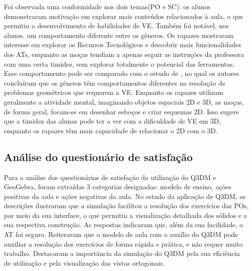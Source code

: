 Foi observada uma conformidade nos dois temas(PO e SC): os alunos
demonstraram motivação em explorar mais conteúdos relacionados à aula, o
que permitiu o desenvolvimento de habilidades de VE. Também foi notável,
nos alunos, um comportamento diferente entre os gêneros. Os rapazes
mostraram interesse em explorar os Recursos Tecnológicos e descobrir
mais funcionalidades dos ATs, enquanto as moças tendiam a apenas seguir
as instruções da professora com uma certa timidez, sem explorar
totalmente o potencial das ferramentas. Esse comportamento pode ser
comparado com o estudo de \textcite{fiantika2018}, no qual os autores
concluíram que os gêneros têm comportamentos diferentes na resolução de
problemas geométricos que requerem a VE. Enquanto os rapazes utilizam
geralmente a atividade mental, imaginando objetos espaciais 2D e 3D, as
moças, de forma geral, focam-se em desenhar esboços e criar esquemas 2D.
Isso sugere que a timidez das alunas pode ter a ver com a dificuldade de
VE em 3D, enquanto os rapazes têm mais capacidade de relacionar o 2D com
o 3D.

\subsection{Análise do questionário de satisfação}\label{sub-sec-Análise do questionário de satisfação}

Para a análise dos questionários de satisfação da utilização do Q3DM e
GeoGebra, foram extraídas 3 categorias designadas: modelo de ensino,
ações positivas da aula e ações negativas da aula. No estudo da
aplicação de Q3DM, as descrições ilustraram que a simulação facilitou a
resolução dos exercícios das POs, por meio da sua interface, o que
permitiu a visualização detalhada dos sólidos e a sua respectiva
construção. As respostas indicaram que, além da sua facilidade, o AT foi
seguro. Reiteraram que o modelo de aula com o auxílio do Q3DM pode
auxiliar a resolução dos exercícios de forma rápida e prática, e não
requer muito trabalho. Destacaram a importância da simulação do Q3DM
pela sua eficiência de utilização e pela visualização das vistas
ortogonais.

